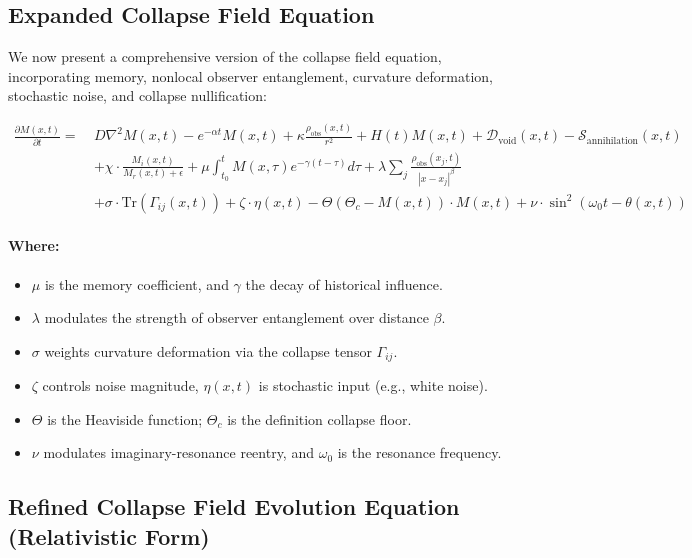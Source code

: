 \subsection{Expanded Collapse Field Equation}

We now present a comprehensive version of the collapse field equation, incorporating memory, nonlocal observer entanglement, curvature deformation, stochastic noise, and collapse nullification:

\begin{equation}
\begin{aligned}
\frac{\partial M(x,t)}{\partial t} =\ & D \nabla^2 M(x,t)
- e^{-\alpha t} M(x,t)
+ \kappa \frac{\rho_{\text{obs}}(x,t)}{r^2}
+ H(t) M(x,t)
+ \mathcal{D}_{\text{void}}(x,t)
- \mathcal{S}_{\text{annihilation}}(x,t) \\
&+ \chi \cdot \frac{M_i(x,t)}{M_r(x,t) + \epsilon}
+ \mu \int_{t_0}^{t} M(x,\tau) e^{-\gamma(t - \tau)} d\tau
+ \lambda \sum_j \frac{\rho_{\text{obs}}(x_j,t)}{|x - x_j|^\beta} \\
&+ \sigma \cdot \text{Tr}(\Gamma_{ij}(x,t))
+ \zeta \cdot \eta(x,t)
- \Theta(\Theta_c - M(x,t)) \cdot M(x,t)
+ \nu \cdot \sin^2\left( \omega_0 t - \theta(x,t) \right)
\end{aligned}
\end{equation}

\paragraph{Where:}
\begin{itemize}
    \item $\mu$ is the memory coefficient, and $\gamma$ the decay of historical influence.
    \item $\lambda$ modulates the strength of observer entanglement over distance $\beta$.
    \item $\sigma$ weights curvature deformation via the collapse tensor $\Gamma_{ij}$.
    \item $\zeta$ controls noise magnitude, $\eta(x,t)$ is stochastic input (e.g., white noise).
    \item $\Theta$ is the Heaviside function; $\Theta_c$ is the definition collapse floor.
    \item $\nu$ modulates imaginary-resonance reentry, and $\omega_0$ is the resonance frequency.
\end{itemize}

\subsection{Refined Collapse Field Evolution Equation (Relativistic Form)}

